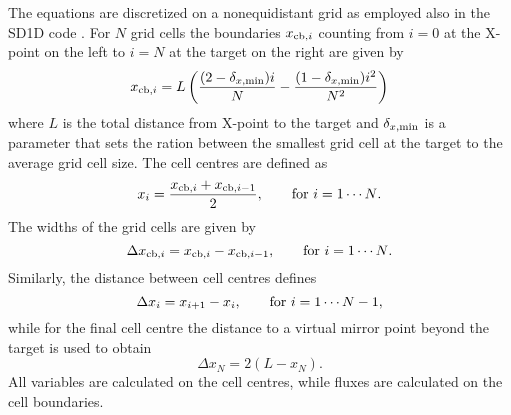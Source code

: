 \documentclass[amsmath,amssymb,a4]{revtex4-2}
\begin{document}
The equations are discretized on a nonequidistant grid as employed also in the SD1D code \cite{SD1D}. For  $N$ grid cells the boundaries $x_{{\rm cb},i}$ counting from $i = 0$ at the X-point on the left to $i =N$ at the target on the right are given by \cite{SD1D}
\begin{equation}\label{cell_boundaries}
   x_{{\rm cb},i} = L \left( {(2 - \delta_{x,{\rm min}}) i \over N} - {(1 - \delta_{x,{\rm min}}) i^2 \over N^2} \right)
\end{equation}
where $L$ is the total distance from X-point to the target and $\delta_{x,{\rm min}}$ is a parameter that sets the ration between the smallest grid cell at the target to the average grid cell size. The cell centres are defined as
\begin{equation}\label{cell_centres}
    x_i = {x_{{\rm cb},i} + x_{{\rm cb},i-1} \over 2}, \quad\quad\hbox{for $i = 1 \cdots N$}.
\end{equation}
The widths of the grid cells are given by
\begin{equation}\label{cell_width}
    \Delta x_{{\rm cb},i} = x_{{\rm cb},i} - x_{{\rm cb},i-1}, \quad\quad\hbox{for $i = 1 \cdots N$}.
\end{equation}
Similarly, the distance between cell centres defines
\begin{equation}\label{deltax}
    \Delta x_i = x_{i+1} - x_{i}, \quad\quad\hbox{for $i = 1 \cdots N-1$},
\end{equation}
while for the final cell centre the distance to a virtual mirror point beyond the target is used to obtain
\begin{equation}
    \Delta x_N = 2 ( L - x_N ).
\end{equation}
All variables are calculated on the cell centres, while fluxes are calculated on the cell boundaries.
\end{document}
